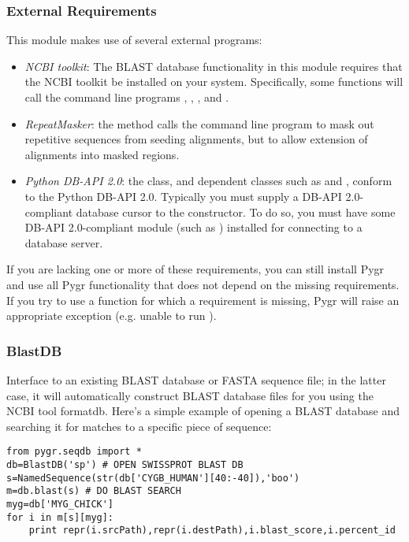 \documentclass{howto}
\begin{document}
\subsubsection{External Requirements}
This module makes use of several external programs:
\begin{itemize}
\item
{\em NCBI toolkit}: The BLAST database functionality in this module 
requires that the NCBI toolkit
be installed on your system.  Specifically, some functions will call the command line
programs , , , and .

\item
{\em RepeatMasker}: the  method calls the command line
program  to mask out repetitive sequences from seeding alignments,
but to allow extension of alignments into masked regions.

\item
{\em Python DB-API 2.0}: the  class, and dependent classes such as 
 and , conform to the Python DB-API 2.0.
Typically you must supply a DB-API 2.0-compliant database cursor to the 
 constructor.  To do so, you must have some DB-API 2.0-compliant
module (such as ) installed for connecting to a database server.
\end{itemize} 

If you are lacking one or more of these requirements, you can still install Pygr
and use all Pygr functionality that does not depend on the missing requirements.
If you try to use a function for which a requirement is missing, Pygr will raise
an appropriate exception (e.g. unable to run ).

\subsubsection{BlastDB}
Interface to an existing BLAST database or FASTA sequence file; in the latter case, it will automatically construct BLAST database files for you using the NCBI tool formatdb. Here's a simple example of opening a BLAST database and searching it for matches to a specific piece of sequence:

\begin{verbatim}
from pygr.seqdb import *
db=BlastDB('sp') # OPEN SWISSPROT BLAST DB
s=NamedSequence(str(db['CYGB_HUMAN'][40:-40]),'boo')
m=db.blast(s) # DO BLAST SEARCH
myg=db['MYG_CHICK']
for i in m[s][myg]:
    print repr(i.srcPath),repr(i.destPath),i.blast_score,i.percent_id
\end{verbatim}
\end{document}
